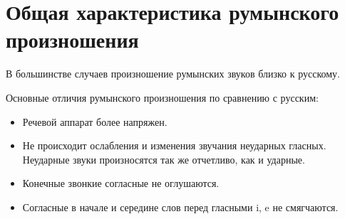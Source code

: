 \section{Общая характеристика румынского произношения}

В большинстве случаев произношение румынских звуков близко к русскому.

Основные отличия румынского произношения по сравнению с русским:
\begin{itemize}
    \item Речевой аппарат более напряжен.
    \item Не происходит ослабления и изменения звучания неударных гласных.
          Неударные звуки произносятся так же отчетливо, как и ударные.
    \item Конечные звонкие согласные не оглушаются.
    \item Согласные в начале и середине слов перед гласными i, e не смягчаются.
\end{itemize}
